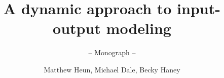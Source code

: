\documentclass[graybox,envcountchap,sectrefs]{svmono}
\begin{document}
\author{Matthew Heun, Michael Dale,  Becky Haney}
\title{A dynamic approach to input-output modeling}
\subtitle{-- Monograph --}
\maketitle

\frontmatter%

%
%
%
%

\tableofcontents

%


\mainmatter%









 

 





 








%

\backmatter%
%
%

\end{document}
